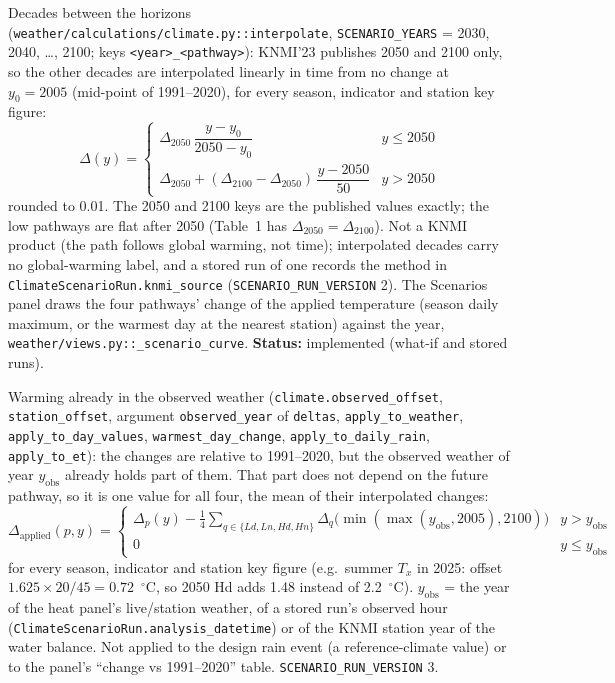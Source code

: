 \documentclass[11pt]{article}
\newcommand{\code}[1]{\texttt{#1}}
\begin{document}
Decades between the horizons (\code{weather/calculations/climate.py::interpolate}, \code{SCENARIO\_YEARS} = 2030, 2040, \ldots, 2100; keys \code{<year>\_<pathway>}): KNMI'23 publishes 2050 and 2100 only, so the other decades are interpolated linearly in time from no change at $y_0 = 2005$ (mid-point of 1991--2020), for every season, indicator and station key figure:
\begin{equation}
  \Delta(y) = \begin{cases}
    \Delta_{2050}\,\dfrac{y - y_0}{2050 - y_0} & y \leq 2050\\[6pt]
    \Delta_{2050} + (\Delta_{2100} - \Delta_{2050})\,\dfrac{y - 2050}{50} & y > 2050
  \end{cases}
\end{equation}
rounded to 0.01. The 2050 and 2100 keys are the published values exactly; the low pathways are flat after 2050 (Table~1 has $\Delta_{2050} = \Delta_{2100}$). Not a KNMI product (the path follows global warming, not time); interpolated decades carry no global-warming label, and a stored run of one records the method in \code{ClimateScenarioRun.knmi\_source} (\code{SCENARIO\_RUN\_VERSION} 2). The Scenarios panel draws the four pathways' change of the applied temperature (season daily maximum, or the warmest day at the nearest station) against the year, \code{weather/views.py::\_scenario\_curve}. \textbf{Status:} implemented (what-if and stored runs).

Warming already in the observed weather (\code{climate.observed\_offset}, \code{station\_offset}, argument \code{observed\_year} of \code{deltas}, \code{apply\_to\_weather}, \code{apply\_to\_day\_values}, \code{warmest\_day\_change}, \code{apply\_to\_daily\_rain}, \code{apply\_to\_et}): the changes are relative to 1991--2020, but the observed weather of year $y_{\mathrm{obs}}$ already holds part of them. That part does not depend on the future pathway, so it is one value for all four, the mean of their interpolated changes:
\begin{equation}
  \Delta_{\mathrm{applied}}(p, y) = \begin{cases}
    \Delta_p(y) - \tfrac{1}{4}\sum_{q \in \{Ld, Ln, Hd, Hn\}} \Delta_q\big(\min(\max(y_{\mathrm{obs}}, 2005), 2100)\big) & y > y_{\mathrm{obs}}\\
    0 & y \leq y_{\mathrm{obs}}
  \end{cases}
\end{equation}
for every season, indicator and station key figure (e.g.\ summer $T_x$ in 2025: offset $1.625 \times 20/45 = 0.72$~$^\circ$C, so 2050 Hd adds 1.48 instead of 2.2~$^\circ$C). $y_{\mathrm{obs}}$ = the year of the heat panel's live/station weather, of a stored run's observed hour (\code{ClimateScenarioRun.analysis\_datetime}) or of the KNMI station year of the water balance. Not applied to the design rain event (a reference-climate value) or to the panel's ``change vs 1991--2020'' table. \code{SCENARIO\_RUN\_VERSION} 3.
\end{document}
